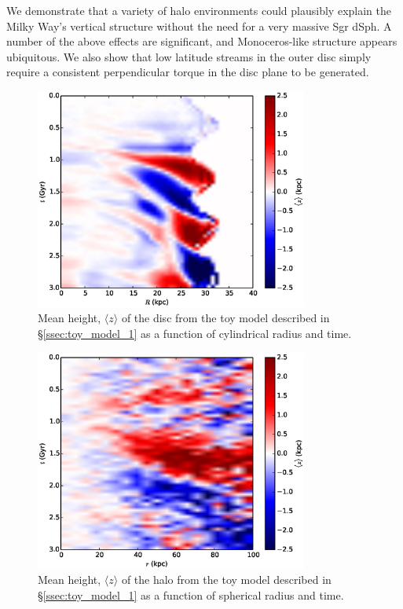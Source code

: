 We demonstrate that a variety of halo environments could plausibly explain the Milky Way's vertical structure without the need for a very massive Sgr dSph. A number of the above effects are significant, and Monoceros-like structure appears ubiquitous. We also show that low latitude streams in the outer disc simply require a consistent perpendicular torque in the disc plane to be generated.



\begin{figure}
	\centering
	\includegraphics[width=0.8\textwidth]{../figures/isolated_z_0_r_a.eps}
	\caption{Mean height, $\langle z \rangle$ of the disc from the toy model described in \S\ref{ssec:toy_model_1} as a function of cylindrical radius and time.} \label{fig:toy_model_1_mean_height}
\end{figure}

\begin{figure}
	\centering
	\includegraphics[width=0.8\textwidth]{../figures/isolated_z_0_r_a_halo.eps}
	\caption{Mean height, $\langle z \rangle$ of the halo from the toy model described in \S\ref{ssec:toy_model_1} as a function of spherical radius and time.} \label{fig:toy_model_1_mean_height_halo}
\end{figure}


